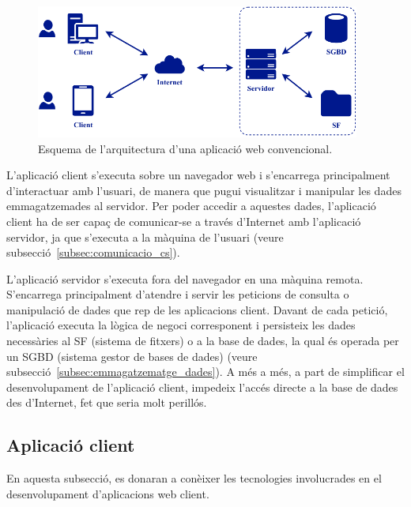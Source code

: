 \documentclass[a4paper,12pt]{ThesisStyle}
\begin{document}
\begin{figure}[H]
  \centering
  \includegraphics[width=0.95\textwidth]{assets/figs/esquemaWeb.pdf}
  \caption{\label{img:esquema_web}Esquema de l'arquitectura d'una aplicació web convencional.}
\end{figure}

L'aplicació client s'executa sobre un navegador web i s'encarrega principalment d'interactuar amb l'usuari, de manera que pugui visualitzar i manipular les dades emmagatzemades al servidor. Per poder accedir a aquestes dades, l'aplicació client ha de ser capaç de comunicar-se a través d'Internet amb l'aplicació servidor, ja que s'executa a la màquina de l'usuari (veure subsecció~\ref{subsec:comunicacio_cs}).

L'aplicació servidor s'executa fora del navegador en una màquina remota. S'encarrega principalment d'atendre i servir les peticions de consulta o manipulació de dades que rep de les aplicacions client. Davant de cada petició, l'aplicació executa la lògica de negoci corresponent i persisteix les dades necessàries al SF (sistema de fitxers) o a la base de dades, la qual és operada per un SGBD (sistema gestor de bases de dades) (veure subsecció~\ref{subsec:emmagatzematge_dades}). A més a més, a part de simplificar el desenvolupament de l'aplicació client, impedeix l'accés directe a la base de dades des d'Internet, fet que seria molt perillós.

\subsection{Aplicació client}
\label{subsec:aplicacio_client}

En aquesta subsecció, es donaran a conèixer les tecnologies involucrades en el desenvolupament d'aplicacions web client.
\end{document}
